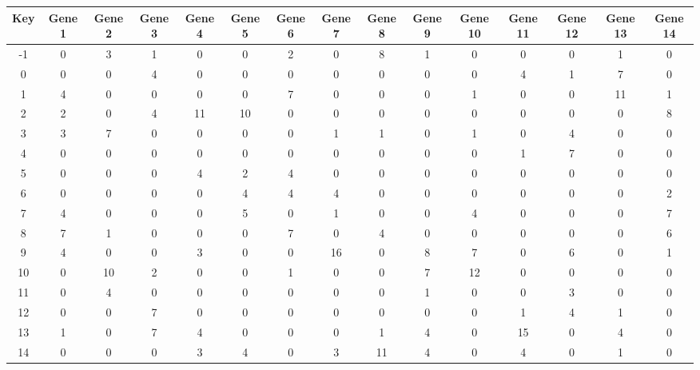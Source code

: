 \begin{tabular}{|c|c|c|c|c|c|c|c|c|c|c|c|c|c|c|}
\hline
Key & Gene 1 & Gene 2 & Gene 3 & Gene 4 & Gene 5 & Gene 6 & Gene 7 & Gene 8 & Gene 9 & Gene 10 & Gene 11 & Gene 12 & Gene 13 & Gene 14 \\
\hline
-1 & 0 & 3 & 1 & 0 & 0 & 2 & 0 & 8 & 1 & 0 & 0 & 0 & 1 & 0 \\
0 & 0 & 0 & 4 & 0 & 0 & 0 & 0 & 0 & 0 & 0 & 4 & 1 & 7 & 0 \\
1 & 4 & 0 & 0 & 0 & 0 & 7 & 0 & 0 & 0 & 1 & 0 & 0 & 11 & 1 \\
2 & 2 & 0 & 4 & 11 & 10 & 0 & 0 & 0 & 0 & 0 & 0 & 0 & 0 & 8 \\
3 & 3 & 7 & 0 & 0 & 0 & 0 & 1 & 1 & 0 & 1 & 0 & 4 & 0 & 0 \\
4 & 0 & 0 & 0 & 0 & 0 & 0 & 0 & 0 & 0 & 0 & 1 & 7 & 0 & 0 \\
5 & 0 & 0 & 0 & 4 & 2 & 4 & 0 & 0 & 0 & 0 & 0 & 0 & 0 & 0 \\
6 & 0 & 0 & 0 & 0 & 4 & 4 & 4 & 0 & 0 & 0 & 0 & 0 & 0 & 2 \\
7 & 4 & 0 & 0 & 0 & 5 & 0 & 1 & 0 & 0 & 4 & 0 & 0 & 0 & 7 \\
8 & 7 & 1 & 0 & 0 & 0 & 7 & 0 & 4 & 0 & 0 & 0 & 0 & 0 & 6 \\
9 & 4 & 0 & 0 & 3 & 0 & 0 & 16 & 0 & 8 & 7 & 0 & 6 & 0 & 1 \\
10 & 0 & 10 & 2 & 0 & 0 & 1 & 0 & 0 & 7 & 12 & 0 & 0 & 0 & 0 \\
11 & 0 & 4 & 0 & 0 & 0 & 0 & 0 & 0 & 1 & 0 & 0 & 3 & 0 & 0 \\
12 & 0 & 0 & 7 & 0 & 0 & 0 & 0 & 0 & 0 & 0 & 1 & 4 & 1 & 0 \\
13 & 1 & 0 & 7 & 4 & 0 & 0 & 0 & 1 & 4 & 0 & 15 & 0 & 4 & 0 \\
14 & 0 & 0 & 0 & 3 & 4 & 0 & 3 & 11 & 4 & 0 & 4 & 0 & 1 & 0 \\
\hline
\end{tabular}